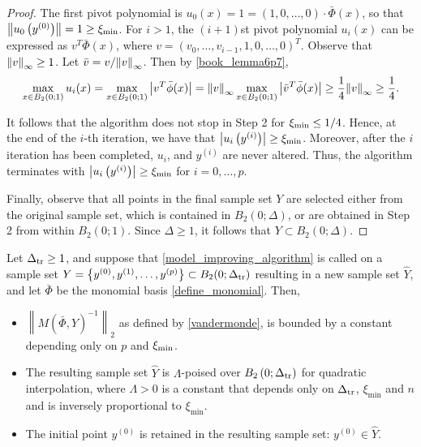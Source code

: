 \documentclass{article}
\begin{document}
\begin{proof}

The first pivot polynomial is $u_0(x) = 1 = (1, 0, \ldots, 0)\cdot \bar\Phi(x)$, so that $\left\|u_0\left(y^{(0)}\right)\right\| = 1 \ge \xi_{\text{min}}$.
For $i > 1$, the $(i+1)$st pivot polynomial $u_i(x)$ can be expressed as $v^T \bar{\Phi}(x)$,
where $v = (v_0, \ldots, v_{i-1},1,0,\ldots,0)^T$.
Observe that ${\left\|v\right\|}_{\infty} \ge 1$.
Let $\bar{v} = v/{\left\|v\right\|}_{\infty}$.
Then by \cref{book_lemma6p7},
\[ \max_{x \in B_2(0;1)} u_i(x) = \max_{x \in B_2(0;1)} \left| v^T \bar{\phi}(x)\right| =
{\left\|v\right\|}_{\infty} \max_{x \in B_2(0;1)}  \left|\bar{v}^T \bar{\phi}(x)\right| \ge \frac{1}{4} {\left\|v\right\|}_{\infty} \ge \frac{1}{4}.\]

It follows that the algorithm does not stop in Step 2 for $\xi_{\text{min}} \le 1/4$.   Hence, at the end of the $i$-th iteration, we have that  $\left| u_i\left(y^{(i)}\right)\right| \ge \xi_{\text{min}}$.  Moreover,  after the $i$ iteration has been completed,  $u_i$,  and $y^{(i)}$ are never altered.  Thus, the algorithm terminates with  $\left| u_i\left(y^{(i)}\right)\right| \ge \xi_{\text{min}}$ for $i=0, \ldots, p$.

Finally,  observe that all points in the final sample set $Y$ are selected either from the original sample set, which is contained in $B_2(0;\Delta)$,  or are obtained in Step 2 from within $B_2(0;1)$.  Since $\Delta  \ge 1$, it follows that $Y \subset B_2(0;\Delta)$.

\end{proof}

\begin{theorem}
\label{set_is_poised}

Let $\Delta_{\textrm{tr}} \ge 1$, and suppose that \cref{model_improving_algorithm} is called on a sample set
$Y = \left\{y^{(0)}, y^{(1)}, \ldots, y^{(p)}\right\} \subset B_2(0; \Delta_{\textrm{tr}})$
resulting in a new sample set $\hat Y$,
and let $\bar{\Phi}$ be the monomial basis \cref{define_monomial}.
Then,
\begin{itemize}
\item $\left\|M(\bar \Phi, \hat Y)^{-1}\right\|_2$ as defined by \cref{vandermonde}, is bounded by a constant depending only on $p$ and $\xi_{\text{min}}$.
\item The resulting sample set $\hat Y$ is $\Lambda$-poised over $B_2\left(0;\Delta_{\textrm{tr}} \right)$ for quadratic interpolation,
where $\Lambda > 0$ is a constant that depends only on $\Delta_{\textrm{tr}}$, $\xi_{\text{min}}$ and $n$ and is inversely proportional to $\xi_{\text{min}}$.
\item The initial point $y^{(0)}$ is retained in the resulting sample set: $y^{(0)} \in \hat Y$.
\end{itemize}
\end{theorem}
\end{document}
